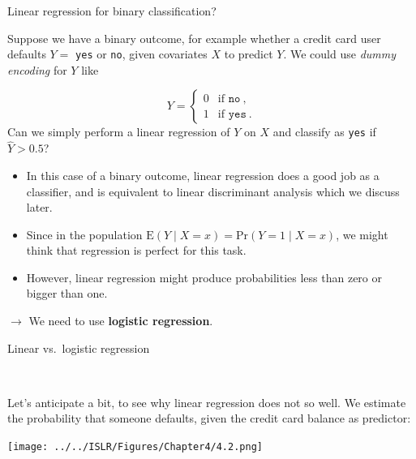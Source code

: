 \documentclass[10pt,ignorenonframetext,]{beamer}
\begin{document}
\begin{frame}[fragile]

\begin{block}{Linear regression for binary classification?}

\vspace{1mm}

Suppose we have a binary outcome, for example whether a credit card user
defaults \(Y =\) \texttt{yes} or \texttt{no}, given covariates \(X\) to
predict \(Y\). We could use \emph{dummy encoding} for \(Y\) like

\[Y = \left\{ \begin{array}{ll}
0 & \text{if } \texttt{no} \ , \\
1 & \text{if } \texttt{yes} \ .
\end{array} \right.\] Can we simply perform a linear regression of \(Y\)
on \(X\) and classify as \texttt{yes} if \(\hat{Y}> 0.5\)?

\begin{itemize}
\item
  In this case of a binary outcome, linear regression does a good job as
  a classifier, and is equivalent to linear discriminant analysis which
  we discuss later.
\item
  Since in the population
  \(\text{E}(Y \mid X = x) = \text{Pr}(Y = 1 \mid X = x)\), we might
  think that regression is perfect for this task.
\item
  However, linear regression might produce probabilities less than zero
  or bigger than one.
\end{itemize}

\(\rightarrow\) We need to use \textbf{logistic regression}.

\end{block}

\end{frame}

\begin{frame}

\begin{block}{Linear vs.~logistic regression}

\(~\)

Let's anticipate a bit, to see why linear regression does not so well.
We estimate the probability that someone defaults, given the credit card
balance as predictor: \vspace{2mm}

\texttt{[image: ../../ISLR/Figures/Chapter4/4.2.png]}

\end{block}

\end{frame}
\end{document}
